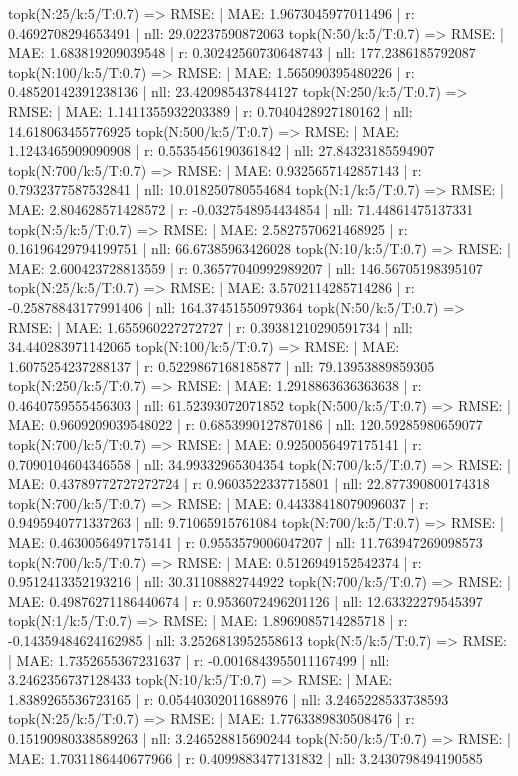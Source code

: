topk(N:25/k:5/T:0.7) => RMSE: | MAE: 1.9673045977011496 | r: 0.4692708294653491 | nll: 29.02237590872063
topk(N:50/k:5/T:0.7) => RMSE: | MAE: 1.683819209039548 | r: 0.30242560730648743 | nll: 177.2386185792087
topk(N:100/k:5/T:0.7) => RMSE: | MAE: 1.565090395480226 | r: 0.48520142391238136 | nll: 23.420985437844127
topk(N:250/k:5/T:0.7) => RMSE: | MAE: 1.1411355932203389 | r: 0.7040428927180162 | nll: 14.618063455776925
topk(N:500/k:5/T:0.7) => RMSE: | MAE: 1.1243465909090908 | r: 0.5535456190361842 | nll: 27.84323185594907
topk(N:700/k:5/T:0.7) => RMSE: | MAE: 0.9325657142857143 | r: 0.7932377587532841 | nll: 10.018250780554684
topk(N:1/k:5/T:0.7) => RMSE: | MAE: 2.804628571428572 | r: -0.0327548954434854 | nll: 71.44861475137331
topk(N:5/k:5/T:0.7) => RMSE: | MAE: 2.5827570621468925 | r: 0.16196429794199751 | nll: 66.67385963426028
topk(N:10/k:5/T:0.7) => RMSE: | MAE: 2.600423728813559 | r: 0.36577040992989207 | nll: 146.56705198395107
topk(N:25/k:5/T:0.7) => RMSE: | MAE: 3.5702114285714286 | r: -0.25878843177991406 | nll: 164.37451550979364
topk(N:50/k:5/T:0.7) => RMSE: | MAE: 1.655960227272727 | r: 0.39381210290591734 | nll: 34.440283971142065
topk(N:100/k:5/T:0.7) => RMSE: | MAE: 1.6075254237288137 | r: 0.5229867168185877 | nll: 79.13953889859305
topk(N:250/k:5/T:0.7) => RMSE: | MAE: 1.2918863636363638 | r: 0.4640759555456303 | nll: 61.52393072071852
topk(N:500/k:5/T:0.7) => RMSE: | MAE: 0.9609209039548022 | r: 0.6853990127870186 | nll: 120.59285980659077
topk(N:700/k:5/T:0.7) => RMSE: | MAE: 0.9250056497175141 | r: 0.7090104604346558 | nll: 34.99332965304354
topk(N:700/k:5/T:0.7) => RMSE: | MAE: 0.43789772727272724 | r: 0.9603522337715801 | nll: 22.877390800174318
topk(N:700/k:5/T:0.7) => RMSE: | MAE: 0.44338418079096037 | r: 0.9495940771337263 | nll: 9.71065915761084
topk(N:700/k:5/T:0.7) => RMSE: | MAE: 0.4630056497175141 | r: 0.9553579006047207 | nll: 11.763947269098573
topk(N:700/k:5/T:0.7) => RMSE: | MAE: 0.5126949152542374 | r: 0.9512413352193216 | nll: 30.31108882744922
topk(N:700/k:5/T:0.7) => RMSE: | MAE: 0.49876271186440674 | r: 0.9536072496201126 | nll: 12.63322279545397
topk(N:1/k:5/T:0.7) => RMSE: | MAE: 1.8969085714285718 | r: -0.14359484624162985 | nll: 3.2526813952558613
topk(N:5/k:5/T:0.7) => RMSE: | MAE: 1.7352655367231637 | r: -0.0016843955011167499 | nll: 3.2462356737128433
topk(N:10/k:5/T:0.7) => RMSE: | MAE: 1.8389265536723165 | r: 0.05440302011688976 | nll: 3.2465228533738593
topk(N:25/k:5/T:0.7) => RMSE: | MAE: 1.7763389830508476 | r: 0.15190980338589263 | nll: 3.246528815690244
topk(N:50/k:5/T:0.7) => RMSE: | MAE: 1.7031186440677966 | r: 0.4099883477131832 | nll: 3.2430798494190585
